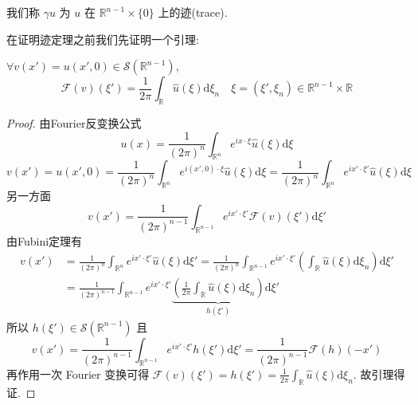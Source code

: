 \documentclass[11pt]{ctexart}[UTF8]
\begin{document}
\begin{definition}
    我们称 $\gamma u$ 为 $u$ 在 $\mathbb{R}^{n-1}\times \{0\}$ 上的迹(trace).
\end{definition}
在证明迹定理之前我们先证明一个引理:
\begin{lemma}
    $\forall v(x')=u(x', 0) \in \mathscr{S}(\mathbb{R}^{n-1})$,
    \begin{equation*}
        \mathcal{F}(v)(\xi') = \frac{1}{2\pi}\int_{\mathbb{R}} \widehat{u}(\xi)\mathrm{d}\xi_{n}\quad \xi = (\xi', \xi_{n}) \in \mathbb{R}^{n-1}\times \mathbb{R}
    \end{equation*}
\end{lemma}
\begin{proof}
    由Fourier反变换公式
    \begin{equation*}
        u(x) = \frac{1}{(2\pi)^{n}} \int_{\mathbb{R}^n} e^{ix\cdot \xi}\widehat{u}(\xi) \mathrm{d}\xi
    \end{equation*}
    \begin{equation*}
        v(x') = u(x', 0) = \frac{1}{(2\pi)^{n}} \int_{\mathbb{R}^n} e^{i(x', 0)\cdot \xi}\widehat{u}(\xi) \mathrm{d}\xi=\frac{1}{(2\pi)^{n}} \int_{\mathbb{R}^n} e^{ix'\cdot \xi'}\widehat{u}(\xi)\mathrm{d}\xi
    \end{equation*}
    另一方面
    \begin{equation*}
        v(x') = \frac{1}{(2\pi)^{n-1}} \int_{\mathbb{R}^{n-1}} e^{ix'\cdot \xi'}\mathcal{F}(v)(\xi') \mathrm{d}\xi'
    \end{equation*}
    由Fubini定理有
    \begin{equation*}
        \begin{aligned}
            v(x') &= \frac{1}{(2\pi)^{n}}\int_{\mathbb{R}^{n}} e^{ix'\cdot \xi'}\widehat{u}(\xi)\mathrm{d}\xi' = \frac{1}{(2\pi)^{n}}\int_{\mathbb{R}^{n-1}} e^{ix'\cdot \xi'}\left( \int_{\mathbb{R}} \widehat{u}(\xi)\mathrm{d}\xi_{n} \right) \mathrm{d}\xi'\\
            &= \frac{1}{(2\pi)^{n-1}} \int_{\mathbb{R}^{n-1}} e^{ix'\cdot \xi'}\underbrace{\left( \frac{1}{2\pi}\int_{\mathbb{R}} \widehat{u}(\xi)\mathrm{d}\xi_{n} \right)}_{h(\xi')} \mathrm{d}\xi'
        \end{aligned}
    \end{equation*}
    所以 $h(\xi') \in \mathscr{S}(\mathbb{R}^{n-1})$ 且
    \begin{equation*}
        v(x') = \frac{1}{(2\pi)^{n-1}} \int_{\mathbb{R}^{n-1}} e^{ix'\cdot \xi'}h(\xi') \mathrm{d}\xi' = \frac{1}{(2\pi)^{n-1}} \mathcal{F}(h)(-x')
    \end{equation*}
    再作用一次 Fourier 变换可得 $\mathcal{F}(v)(\xi') = h(\xi') = \frac{1}{2\pi}\int_{\mathbb{R}} \widehat{u}(\xi)\mathrm{d}\xi_{n}$. 故引理得证.
\end{proof}
\end{document}
